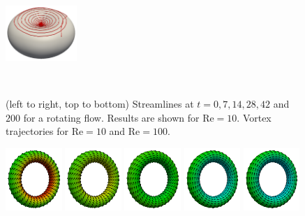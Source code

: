 \documentclass{xdms}
\begin{document}
\begin{figure}[h]
\begin{minipage}{\textwidth}
		\includegraphics[width=0.24\textwidth]{pic/rbc/vortexTrack_re_100.png}
	\end{minipage} \\
	\caption{(left to right, top to bottom) Streamlines at $t = 0, 7, 14, 28, 42$ and $200$ for a rotating flow. Results are shown for $\text{Re}= 10$. 
    Vortex trajectories for $\text{Re} = 10$ and $\text{Re} = 100$.}
	\label{fig4}
\end{figure}
\begin{figure}[h]
	\centering
	\begin{minipage}{0.92\textwidth}
		\includegraphics[width=0.19\textwidth]{pic/torus/re_10/solution_0000.png}
		\includegraphics[width=0.19\textwidth]{pic/torus/re_10/solution_0002.png}
		\includegraphics[width=0.19\textwidth]{pic/torus/re_10/solution_0010.png}
		\includegraphics[width=0.19\textwidth]{pic/torus/re_10/solution_0030.png}
		\includegraphics[width=0.19\textwidth]{pic/torus/re_10/solution_0060.png}

\end{minipage}
\end{figure}
\end{document}
